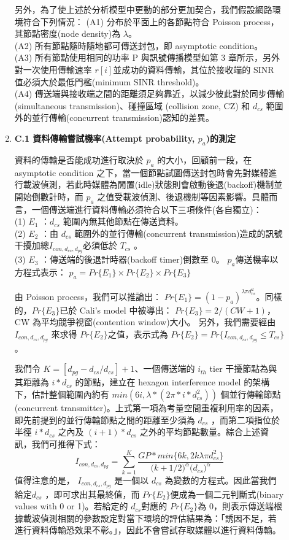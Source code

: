 \documentclass[12pt,a4paper]{article}
\begin{document}
\begin{description}
\begin{enumerate}
另外，為了使上述於分析模型中更動的部分更加契合，我們假設網路環境符合下列情況： 
(A1) 分布於平面上的各節點符合 Poisson process，其節點密度(node density)為 $\lambda$。 \\
(A2) 所有節點隨時隨地都可傳送封包，即 asymptotic condition。 \\
(A3) 所有節點使用相同的功率 P 與訊號傳播模型如第 3 章所示，另外對一次使用傳輸速率 $r[i]$並成功的資料傳輸，其位於接收端的 SINR 值必須大於最低門檻(minimum SINR threshold)。 \\
(A4) 傳送端與接收端之間的距離須足夠靠近，以減少彼此對於同步傳輸(simultaneous transmission)、碰撞區域 (collision zone, CZ) 和 $d_{cs}$ 範圍外的並行傳輸(concurrent transmission)認知的差異。\\


\item [\bf ]{\textbf{\Kai C.1 資料傳輸嘗試機率(Attempt probability, $p_a$)的測定 }}\\
\vspace{-2mm}

資料的傳輸是否能成功進行取決於 $p_a$ 的大小，回顧前一段，在 asymptotic condition 之下，當一個節點試圖傳送封包時會先對媒體進行載波偵測，若此時媒體為閒置(idle)狀態則會啟動後退(backoff)機制並開始倒數計時，而 $p_a$ 之值受載波偵測、後退機制等因素影響。具體而言，一個傳送端進行資料傳輸必須符合以下三項條件(各自獨立)：\\
(1) $E_1$ ：$d_{cs}$ 範圍內無其他節點在傳送資料。 \\
(2) $E_2$ ：由 $d_{cs}$ 範圍外的並行傳輸(concurrent transmission)造成的訊號干擾加總$I_{con,d_{cs},d_{pg}}$必須低於 $T_{cs}$ 。 \\
(3) $E_3$ ：傳送端的後退計時器(backoff timer)倒數至 0。 
$p_a$傳送機率以方程式表示： $p_a = Pr\{E_1\} × Pr\{E_2\} × Pr\{E_3\} $

由 Poisson process，我們可以推論出： $Pr\{E_1\} = (1−p_a)^{\lambda \pi d_{cs}^2}$。同樣的，$Pr\{E_3\}$已於 Cali's model 中被導出： $Pr\{E_3\} = 2/(CW+1)$，CW 為平均競爭視窗(contention window)大小。 
另外，我們需要經由 $I_{con,d_{cs},d_{pg}}$ 來求得 $Pr\{E_2\}$之值，表示式為 $Pr\{E_2\} = Pr \{I_{con,d_{cs},d_{pg}} ≤ T_{cs}\}$。

我們令 $K = [ d_{pg} − d_{cs} / d_{cs} ] + 1$、一個傳送端的 $i_{th}$ tier 干擾節點為與其距離為 $i*d_{cs}$ 的節點，建立在 hexagon interference model 的架構下，估計整個範圍內約有 $min(6i, \lambda*(2\pi*i*d_{cs}^2 ))$ 個並行傳輸節點(concurrent transmitter)。上式第一項為考量空間重複利用率的因素，即先前提到的並行傳輸節點之間的距離至少須為 $d_{cs}$ ，而第二項指位於半徑 $i*d_{cs}$ 之內及 $(i+1)*d_{cs}$ 之外的平均節點數量。綜合上述資訊，我們可推得下式：
$$
I_{con,d_{cs},d_{pg}} =  \sum_{k=1}^K  \frac{GP*min \big\{6k,2k \lambda \pi d_{cs}^2\big\} }{ \big(k+1/2\big) ^\alpha  \big(d_{cs}\big) ^\alpha}
$$
值得注意的是， $I_{con,d_{cs},d_{pg}}$ 是一個以 $d_{cs}$ 為變數的方程式。因此當我們給定$d_{cs}$ ，即可求出其最終值，而 $Pr\{E_2\}$便成為一個二元判斷式(binary values with 0 or 1)。若給定的 $d_{cs}$對應的 $Pr\{E_2\}$為 0，則表示傳送端根據載波偵測相關的參數設定對當下環境的評估結果為：「誘因不足，若進行資料傳輸恐效果不彰。」，因此不會嘗試存取媒體以進行資料傳輸。 \\



\end{enumerate}
\end{description}
\end{document}
